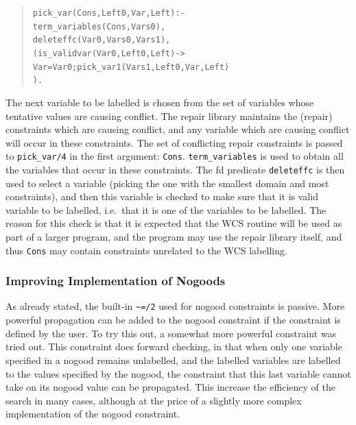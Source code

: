 \begin{quote}\begin{alltt}
pick_var(Cons, Left0, Var, Left) :-
        term_variables(Cons, Vars0),
        deleteffc(Var0, Vars0, Vars1),
        (is_validvar(Var0, Left0, Left) ->
            Var = Var0 ; pick_var1(Vars1, Left0, Var, Left)
        ).
\end{alltt}\end{quote}

\noindent
The next variable to be labelled is chosen from the set of variables whose
tentative values are causing conflict. The repair library maintains the
(repair) constraints which are causing conflict, and any variable which are
causing conflict will occur in these constraints. The set of conflicting
repair constraints is passed to \verb'pick_var/4' in the first argument:
\verb'Cons'. \verb'term_variables' is used to obtain all the variables that
occur in these constraints. The fd predicate \verb'deleteffc' is then used
to select a variable (picking the one with the smallest domain and most
constraints), and then this variable is checked to make sure that it is
valid variable to be labelled, i.e.\ that it is one of the variables to be
labelled. The reason for this check is that it is expected that the WCS
routine will be used as part of a larger program, and the program may use
the repair library itself, and thus \verb'Cons' may contain constraints
unrelated to the WCS labelling. 

\subsubsection{Improving Implementation of Nogoods}

As already stated, the built-in \verb'~=/2' used for nogood constraints is
passive. More powerful propagation can be added to the nogood constraint if
the constraint is defined by the user. To try this out, a somewhat more
powerful constraint was tried out. This constraint does forward checking,
in that when only one variable specified in a nogood remains unlabelled,
and the labelled variables are labelled to the values specified by the
nogood, the constraint that this last variable cannot take on its nogood
value can be propagated. This increase the efficiency of the search in many
cases, although at the price of a slightly more complex implementation
of the nogood constraint. 

